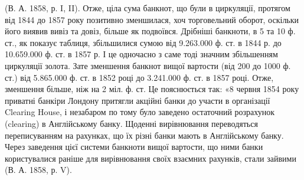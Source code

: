 (В. А. 1858, р. I, II). Отже, ціла сума банкнот, що були в циркуляції, протягом
від 1844 до 1857 року позитивно зменшилася, хоч торговельний оборот,
оскільки його виявив вивіз та довіз, більше як подвоївся. Дрібніші банкноти,
в 5 та 10 ф. ст., як показує таблиця, збільшилися сумою від 9.263.000 ф. ст.
в 1844 р. до 10.659.000 ф. ст. в 1857 р. І це одночасно з саме тоді значним
збільшенням циркуляції золота. Зате зменшення банкнот вищої вартости (від
200 до 1000 ф. ст.) від 5.865.000 ф. ст. в 1852 році до 3.241.000 ф. ст. в
1857 році. Отже, зменшення більше, ніж на 2 міл. ф. ст. Це пояснюється
так: «8 червня 1854 року приватні банкіри Лондону притягли акційні банки
до участи в організації Clearing House, і незабаром по тому було заведено
остаточний розрахунок (clearing) в Англійському банку. Щоденні вирівнювання
переводяться переписуванням на рахунках, що їх різні банки мають в Англійському
банку. Через заведення цієї системи банкноти вищої вартости, що ними
банки користувалися раніше для вирівнювання своїх взаємних рахунків, стали
зайвими (В. А. 1858, р. V).
